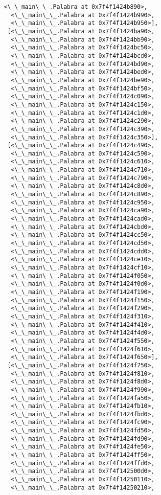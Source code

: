 \documentclass[12pt,a4paper,table]{article}
\begin{document}
\begin{tcolorbox}[breakable, size=fbox, boxrule=.5pt, pad at break*=1mm, opacityfill=0]
\begin{Verbatim}[commandchars=\\\{\}]
  <\_\_main\_\_.Palabra at 0x7f4f1424b890>,
  <\_\_main\_\_.Palabra at 0x7f4f1424b990>,
  <\_\_main\_\_.Palabra at 0x7f4f1424b950>],
 [<\_\_main\_\_.Palabra at 0x7f4f1424ba90>,
  <\_\_main\_\_.Palabra at 0x7f4f1424bb90>,
  <\_\_main\_\_.Palabra at 0x7f4f1424bc50>,
  <\_\_main\_\_.Palabra at 0x7f4f1424bcd0>,
  <\_\_main\_\_.Palabra at 0x7f4f1424bd90>,
  <\_\_main\_\_.Palabra at 0x7f4f1424bed0>,
  <\_\_main\_\_.Palabra at 0x7f4f1424be90>,
  <\_\_main\_\_.Palabra at 0x7f4f1424bf50>,
  <\_\_main\_\_.Palabra at 0x7f4f1424c090>,
  <\_\_main\_\_.Palabra at 0x7f4f1424c150>,
  <\_\_main\_\_.Palabra at 0x7f4f1424c1d0>,
  <\_\_main\_\_.Palabra at 0x7f4f1424c290>,
  <\_\_main\_\_.Palabra at 0x7f4f1424c390>,
  <\_\_main\_\_.Palabra at 0x7f4f1424c350>],
 [<\_\_main\_\_.Palabra at 0x7f4f1424c490>,
  <\_\_main\_\_.Palabra at 0x7f4f1424c590>,
  <\_\_main\_\_.Palabra at 0x7f4f1424c610>,
  <\_\_main\_\_.Palabra at 0x7f4f1424c710>,
  <\_\_main\_\_.Palabra at 0x7f4f1424c790>,
  <\_\_main\_\_.Palabra at 0x7f4f1424c8d0>,
  <\_\_main\_\_.Palabra at 0x7f4f1424c890>,
  <\_\_main\_\_.Palabra at 0x7f4f1424c950>,
  <\_\_main\_\_.Palabra at 0x7f4f1424ca90>,
  <\_\_main\_\_.Palabra at 0x7f4f1424cad0>,
  <\_\_main\_\_.Palabra at 0x7f4f1424cbd0>,
  <\_\_main\_\_.Palabra at 0x7f4f1424cc50>,
  <\_\_main\_\_.Palabra at 0x7f4f1424cd50>,
  <\_\_main\_\_.Palabra at 0x7f4f1424cdd0>,
  <\_\_main\_\_.Palabra at 0x7f4f1424ce10>,
  <\_\_main\_\_.Palabra at 0x7f4f1424cf10>,
  <\_\_main\_\_.Palabra at 0x7f4f1424f050>,
  <\_\_main\_\_.Palabra at 0x7f4f1424f0d0>,
  <\_\_main\_\_.Palabra at 0x7f4f1424f190>,
  <\_\_main\_\_.Palabra at 0x7f4f1424f150>,
  <\_\_main\_\_.Palabra at 0x7f4f1424f290>,
  <\_\_main\_\_.Palabra at 0x7f4f1424f310>,
  <\_\_main\_\_.Palabra at 0x7f4f1424f410>,
  <\_\_main\_\_.Palabra at 0x7f4f1424f4d0>,
  <\_\_main\_\_.Palabra at 0x7f4f1424f550>,
  <\_\_main\_\_.Palabra at 0x7f4f1424f610>,
  <\_\_main\_\_.Palabra at 0x7f4f1424f650>],
 [<\_\_main\_\_.Palabra at 0x7f4f1424f750>,
  <\_\_main\_\_.Palabra at 0x7f4f1424f810>,
  <\_\_main\_\_.Palabra at 0x7f4f1424f8d0>,
  <\_\_main\_\_.Palabra at 0x7f4f1424f990>,
  <\_\_main\_\_.Palabra at 0x7f4f1424fa50>,
  <\_\_main\_\_.Palabra at 0x7f4f1424fb10>,
  <\_\_main\_\_.Palabra at 0x7f4f1424fbd0>,
  <\_\_main\_\_.Palabra at 0x7f4f1424fc90>,
  <\_\_main\_\_.Palabra at 0x7f4f1424fd50>,
  <\_\_main\_\_.Palabra at 0x7f4f1424fd90>,
  <\_\_main\_\_.Palabra at 0x7f4f1424fe50>,
  <\_\_main\_\_.Palabra at 0x7f4f1424ff50>,
  <\_\_main\_\_.Palabra at 0x7f4f1424ffd0>,
  <\_\_main\_\_.Palabra at 0x7f4f142500d0>,
  <\_\_main\_\_.Palabra at 0x7f4f14250110>,
  <\_\_main\_\_.Palabra at 0x7f4f14250210>,

\end{Verbatim}
\end{tcolorbox}
\end{document}
